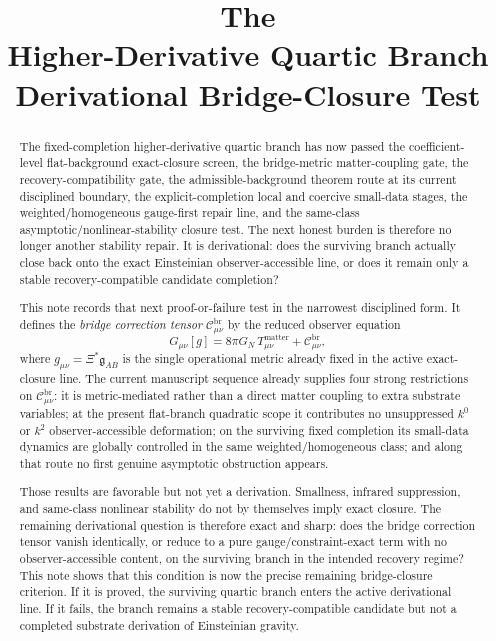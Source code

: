\documentclass[11pt]{article}
\title{\textbf{The \TheoryName{}}\\[0.4em]
\large Higher-Derivative Quartic Branch Derivational Bridge-Closure Test}
\author{}
\date{}
\newcommand{\BridgeMetric}{\mathfrak{g}}
\begin{document}
\maketitle

\begin{abstract}
The fixed-completion higher-derivative quartic branch has now passed the coefficient-level flat-background exact-closure screen, the bridge-metric matter-coupling gate, the recovery-compatibility gate, the admissible-background theorem route at its current disciplined boundary, the explicit-completion local and coercive small-data stages, the weighted/homogeneous gauge-first repair line, and the same-class asymptotic/nonlinear-stability closure test. The next honest burden is therefore no longer another stability repair. It is derivational: does the surviving branch actually close back onto the exact Einsteinian observer-accessible line, or does it remain only a stable recovery-compatible candidate completion?

This note records that next proof-or-failure test in the narrowest disciplined form. It defines the \emph{bridge correction tensor} \(\mathcal C_{\mu\nu}^{\mathrm{br}}\) by the reduced observer equation
\[
G_{\mu\nu}[g]
=
8\pi G_N\,T_{\mu\nu}^{\mathrm{matter}}
+ \mathcal C_{\mu\nu}^{\mathrm{br}},
\]
where \(g_{\mu\nu}=\Xi^\ast\BridgeMetric_{AB}\) is the single operational metric already fixed in the active exact-closure line. The current manuscript sequence already supplies four strong restrictions on \(\mathcal C_{\mu\nu}^{\mathrm{br}}\): it is metric-mediated rather than a direct matter coupling to extra substrate variables; at the present flat-branch quadratic scope it contributes no unsuppressed \(k^0\) or \(k^2\) observer-accessible deformation; on the surviving fixed completion its small-data dynamics are globally controlled in the same weighted/homogeneous class; and along that route no first genuine asymptotic obstruction appears.

Those results are favorable but not yet a derivation. Smallness, infrared suppression, and same-class nonlinear stability do not by themselves imply exact closure. The remaining derivational question is therefore exact and sharp: does the bridge correction tensor vanish identically, or reduce to a pure gauge/constraint-exact term with no observer-accessible content, on the surviving branch in the intended recovery regime? This note shows that this condition is now the precise remaining bridge-closure criterion. If it is proved, the surviving quartic branch enters the active derivational line. If it fails, the branch remains a stable recovery-compatible candidate but not a completed substrate derivation of Einsteinian gravity.
\end{abstract}
\end{document}
